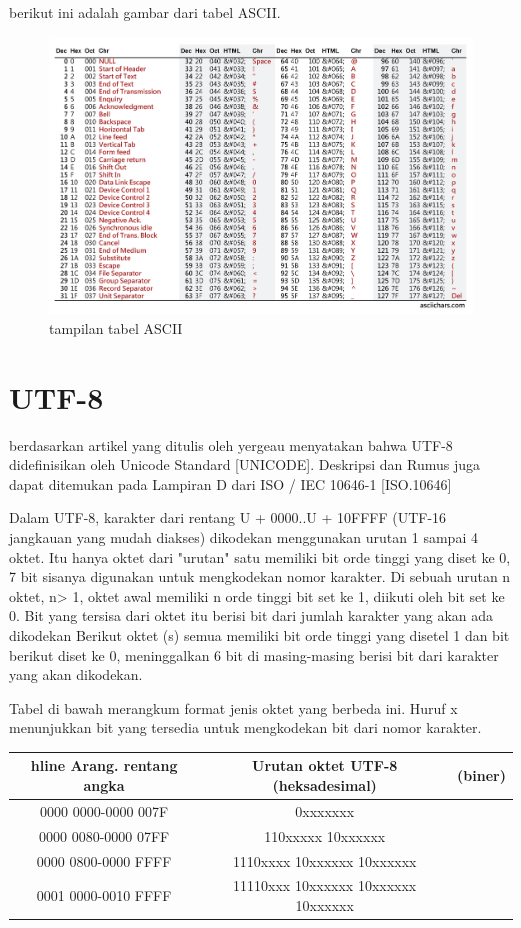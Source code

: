  	berikut ini adalah gambar dari tabel ASCII.
 	\begin{figure}[ht]
\centerline{\includegraphics[width=1\textwidth]{figures/ASCII.JPG}}
\caption{tampilan tabel ASCII}
\label{ASCII}
\end{figure}

	\section{UTF-8}
	 berdasarkan artikel yang ditulis oleh yergeau menyatakan bahwa \cite{yergeau1996utf}
		UTF-8 didefinisikan oleh Unicode Standard [UNICODE]. Deskripsi dan
   Rumus juga dapat ditemukan pada Lampiran D dari ISO / IEC 10646-1 [ISO.10646]

   Dalam UTF-8, karakter dari rentang U + 0000..U + 10FFFF (UTF-16
   jangkauan yang mudah diakses) dikodekan menggunakan urutan 1 sampai 4 oktet. Itu
   hanya oktet dari "urutan" satu memiliki bit orde tinggi yang diset ke 0,
   7 bit sisanya digunakan untuk mengkodekan nomor karakter. Di sebuah
   urutan n oktet, n> 1, oktet awal memiliki n orde tinggi
   bit set ke 1, diikuti oleh bit set ke 0. Bit yang tersisa dari
   oktet itu berisi bit dari jumlah karakter yang akan ada
   dikodekan Berikut oktet (s) semua memiliki bit orde tinggi yang disetel
   1 dan bit berikut diset ke 0, meninggalkan 6 bit di masing-masing berisi
   bit dari karakter yang akan dikodekan.

   Tabel di bawah merangkum format jenis oktet yang berbeda ini.
   Huruf x menunjukkan bit yang tersedia untuk mengkodekan bit dari
   nomor karakter.
 \begin{table}[H]
 \begin{tabular}{|c|c|c}
 hline
 Arang. rentang angka & Urutan oktet UTF-8
 (heksadesimal) & (biner)\\
 \hline
 0000 0000-0000 007F & 0xxxxxxx\\
 0000 0080-0000 07FF & 110xxxxx 10xxxxxx\\
 0000 0800-0000 FFFF & 1110xxxx 10xxxxxx 10xxxxxx\\
 0001 0000-0010 FFFF & 11110xxx 10xxxxxx 10xxxxxx 10xxxxxx\\
\hline
\end{tabular}
\end{table}

